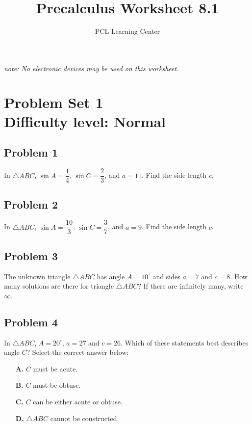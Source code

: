 \documentclass[12pt]{article}
\title{Precalculus Worksheet 8.1}
\author{PCL Learning Center}
\date{}
\begin{document}
\maketitle
\begin{center}
    \textit{note: No electronic devices may be used on this worksheet.}    
\end{center}

\section*{Problem Set 1\\Difficulty level: Normal}

\subsection*{Problem 1}
In \(\triangle ABC\), \(\sin A = \dfrac{1}{4}\), \(\sin C = \dfrac{2}{3}\), and \(a = 11\). Find the side length \(c\).

\subsection*{Problem 2}
In \(\triangle ABC\), \(\sin A = \dfrac{10}{3}\), \(\sin C = \dfrac{3}{7}\), and \(a = 9\). Find the side length \(c\).  


\subsection*{Problem 3}
The unknown triangle \(\triangle ABC\) has angle \(A = 10^\circ\) and sides \(a = 7\) and \(c = 8\).  
How many solutions are there for triangle \(\triangle ABC\)?  
If there are infinitely many, write \(\infty\).

\subsection*{Problem 4}
In \(\triangle ABC\), \(A = 20^\circ\), \(a = 27\) and \(c = 26\). Which of these statements best describes angle \(C\)?  
Select the correct answer below:
\begin{enumerate}
    \item[\textbf{A.}] \(C\) must be acute.
    \item[\textbf{B.}] \(C\) must be obtuse.
    \item[\textbf{C.}] \(C\) can be either acute or obtuse.
    \item[\textbf{D.}] \(\triangle ABC\) cannot be constructed.
\end{enumerate}
\end{document}
